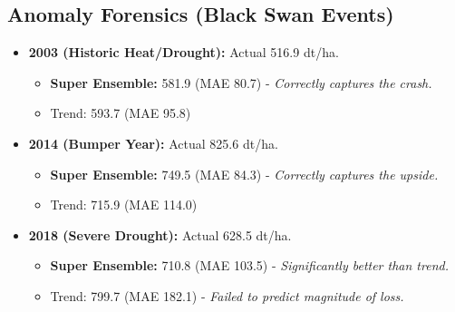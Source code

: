 \subsection{Anomaly Forensics (Black Swan Events)}
\begin{itemize}
    \item \textbf{2003 (Historic Heat/Drought):} Actual 516.9 dt/ha.
    \begin{itemize}
        \item \textbf{Super Ensemble:} 581.9 (MAE 80.7) - \textit{Correctly captures the crash.}
        \item Trend: 593.7 (MAE 95.8)
    \end{itemize}
    \item \textbf{2014 (Bumper Year):} Actual 825.6 dt/ha.
    \begin{itemize}
        \item \textbf{Super Ensemble:} 749.5 (MAE 84.3) - \textit{Correctly captures the upside.}
        \item Trend: 715.9 (MAE 114.0)
    \end{itemize}
    \item \textbf{2018 (Severe Drought):} Actual 628.5 dt/ha.
    \begin{itemize}
        \item \textbf{Super Ensemble:} 710.8 (MAE 103.5) - \textit{Significantly better than trend.}
        \item Trend: 799.7 (MAE 182.1) - \textit{Failed to predict magnitude of loss.}
    \end{itemize}
\end{itemize}
